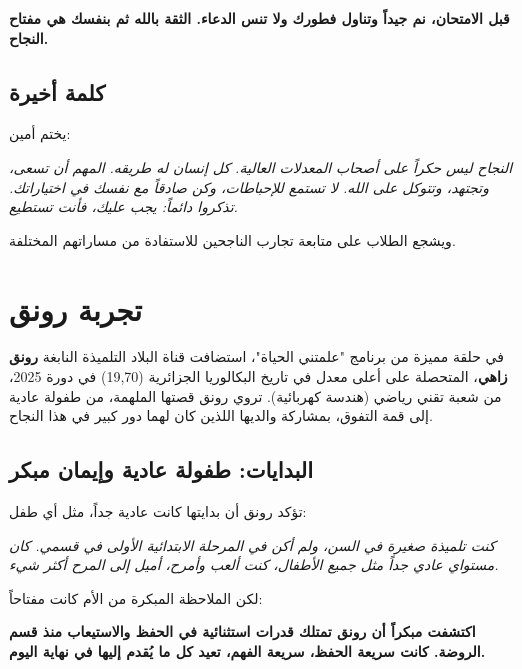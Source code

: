 \documentclass[12pt,a4paper]{book}
\newcommand{\quoteAr}[1]{%
	\begin{myquote}
		\itshape #1
	\end{myquote}
}
\newcommand{\importantAr}[1]{%
	\begin{important}
		\bfseries #1
	\end{important}
}
\begin{document}
	\importantAr{قبل الامتحان، نم جيداً وتناول فطورك ولا تنس الدعاء. الثقة بالله ثم بنفسك هي مفتاح النجاح.}
	
	
	\subsection{كلمة أخيرة}
	
	يختم أمين:
	
	\quoteAr{النجاح ليس حكراً على أصحاب المعدلات العالية. كل إنسان له طريقه. المهم أن تسعى، وتجتهد، وتتوكل على الله. لا تستمع للإحباطات، وكن صادقاً مع نفسك في اختياراتك. تذكروا دائماً: يجب عليك، فأنت تستطيع.}
	
	ويشجع الطلاب على متابعة تجارب الناجحين للاستفادة من مساراتهم المختلفة.
	

	
	\section{ تجربة رونق}
	
	في حلقة مميزة من برنامج "علمتني الحياة"، استضافت قناة البلاد التلميذة النابغة \textbf{رونق زاهي}، المتحصلة على أعلى معدل في تاريخ البكالوريا الجزائرية (19,70) في دورة 2025، من شعبة تقني رياضي (هندسة كهربائية). تروي رونق قصتها الملهمة، من طفولة عادية إلى قمة التفوق، بمشاركة والديها اللذين كان لهما دور كبير في هذا النجاح.
	
	\subsection{البدايات: طفولة عادية وإيمان مبكر}
	تؤكد رونق أن بدايتها كانت عادية جداً، مثل أي طفل:
	\quoteAr{كنت تلميذة صغيرة في السن، ولم أكن في المرحلة الابتدائية الأولى في قسمي. كان مستواي عادي جداً مثل جميع الأطفال، كنت ألعب وأمرح، أميل إلى المرح أكثر شيء.}
	لكن الملاحظة المبكرة من الأم كانت مفتاحاً:
	\importantAr{ اكتشفت مبكراً أن رونق تمتلك قدرات استثنائية في الحفظ و\newline الاستيعاب منذ قسم الروضة. كانت سريعة الحفظ، سريعة الفهم، تعيد كل ما يُقدم إليها في نهاية اليوم.}
	
\end{document}
